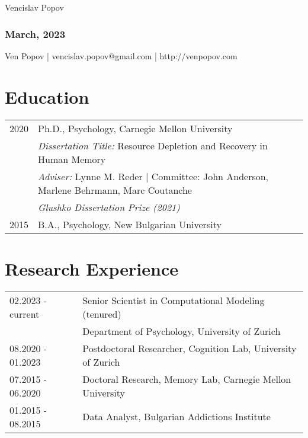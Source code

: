 \documentclass[letterpaper]{article}
\def\name{Vencislav Popov}
\begin{document}
{\huge \name}



\subsubsection*{March, 2023}
\begin{minipage}{0.80\linewidth}
	Ven Popov  | vencislav.popov@gmail.com | http://venpopov.com\\
\end{minipage}


\section*{Education}


\begin{tabular}{ll}
	2020 & Ph.D., Psychology, Carnegie Mellon University\\
	& {\it Dissertation Title:}  Resource Depletion and Recovery in Human Memory\\
	& {\it Adviser:} Lynne M. Reder | Committee: John Anderson, Marlene Behrmann, Marc Coutanche\\
	& {\it Glushko Dissertation Prize (2021)}\\[6pt]
	2015 & B.A., Psychology, New Bulgarian University\\
\end{tabular}

\section*{Research Experience}


\begin{tabular}{ll}
      02.2023 - current & Senior Scientist in Computational Modeling (tenured)\\
      & Department of Psychology, University of Zurich \\[6pt]
	08.2020 - 01.2023 & Postdoctoral Researcher, Cognition Lab, University of Zurich \\[6pt]
	07.2015 - 06.2020 & Doctoral Research, Memory Lab, Carnegie Mellon University\\[6pt]
	01.2015 - 08.2015 & Data Analyst, Bulgarian Addictions Institute \\
\end{tabular}
\end{document}
